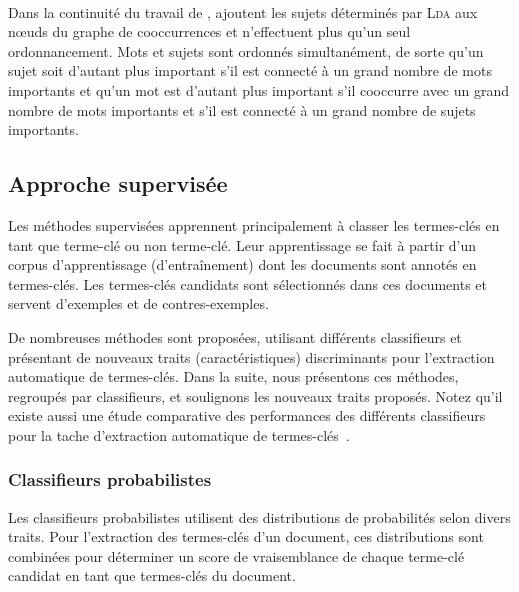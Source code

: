         ~\\Dans la continuité du travail de ,
         ajoutent les sujets déterminés par
        \textsc{Lda} aux n\oe{}uds du graphe de cooccurrences et n'effectuent
        plus qu'un seul ordonnancement. Mots et sujets sont ordonnés
        simultanément, de sorte qu'un sujet soit d'autant plus important
        s'il est connecté à un grand nombre de mots importants et qu'un mot est
        d'autant plus important s'il cooccurre avec un grand nombre de mots
        importants et s'il est connecté à un grand nombre de sujets importants.

    \subsection{Approche supervisée}
    \label{subsec:main-state_of_the_art-automatic_keyphrase_extraction-supervised_keyphrase_extraction}
      Les méthodes supervisées apprennent principalement à classer les
      termes-clés en tant que \og{}terme-clé\fg{} ou \og{}non terme-clé\fg{}.
      Leur apprentissage se fait à partir d'un corpus d'apprentissage
      (d'entraînement) dont les documents sont annotés en termes-clés. Les
      termes-clés candidats sont sélectionnés dans ces documents et servent
      d'exemples et de contres-exemples.

      De nombreuses méthodes sont proposées, utilisant différents classifieurs
      et présentant de nouveaux traits (caractéristiques) discriminants pour
      l'extraction automatique de termes-clés. Dans la suite, nous présentons
      ces méthodes, regroupés par classifieurs, et soulignons les nouveaux
      traits proposés. Notez qu'il existe aussi une étude comparative des
      performances des différents classifieurs pour la tache d'extraction
      automatique de termes-clés~\cite{sarkar2012machinelearningcomparison}.

      \subsubsection{Classifieurs probabilistes}
      \label{subsubsec:main-state_of_the_art-automatic_keyphrase_extraction-supervised_keyphrase_extraction-probabilistic_models}
        Les classifieurs probabilistes utilisent des distributions de
        probabilités selon divers traits. Pour l'extraction des termes-clés d'un
        document, ces distributions sont combinées pour déterminer un score de
        vraisemblance de chaque terme-clé candidat en tant que termes-clés du
        document.

